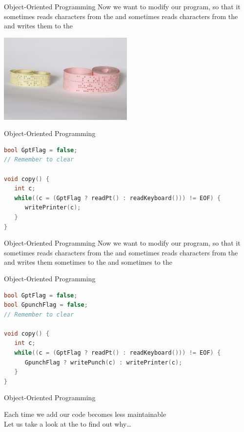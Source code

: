\begin{frame}{Object-Oriented Programming}
Now we want to modify our program, so that it sometimes reads characters
from the  and sometimes reads characters from the
 and writes them to the 
\begin{center}
\includegraphics[width=0.5\textwidth]{resources/PaperTapes.jpg}
\end{center}
\end{frame}

\begin{frame}[fragile]{Object-Oriented Programming}
\begin{lstlisting}[language=c]
bool GptFlag = false;
// Remember to clear

void copy() {
   int c;
   while((c = (GptFlag ? readPt() : readKeyboard())) != EOF) {
      writePrinter(c);
   }
}
\end{lstlisting}
\end{frame}

\begin{frame}{Object-Oriented Programming}
Now we want to modify our program, so that it sometimes reads characters
from the  and sometimes reads characters from the
 and writes them sometimes to the
 and sometimes to the 
\end{frame}

\begin{frame}[fragile]{Object-Oriented Programming}
\begin{lstlisting}[language=c]
bool GptFlag = false;
bool GpunchFlag = false;
// Remember to clear

void copy() {
   int c;
   while((c = (GptFlag ? readPt() : readKeyboard())) != EOF) {
      GpunchFlag ? writePunch(c) : writePrinter(c);
   }
}
\end{lstlisting}
\end{frame}

\begin{frame}{Object-Oriented Programming}
\begin{center}
Each time we add  our code becomes \alert{less
maintainable}\\
Let us take a look at the  to find out why\ldots
\end{center}
\end{frame}

